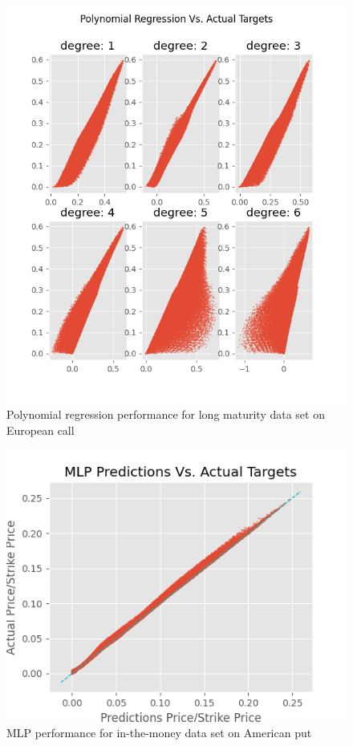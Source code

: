 \begin{figure}[th]
\centering
\includegraphics{Figures/polynomialLongTEuroC.png}
\decoRule
\caption[Polynomial Regression Performance for Long Maturity Data Set European Call]{Polynomial regression performance for long maturity data set on European call}
\label{fig:MLPsEuroCLongMaturity}
\end{figure}


\begin{figure}[th]
\centering
\includegraphics{Figures/inMoneyAmerPut.png}
\decoRule
\caption[MLP Performance for In-the-Money Data Set American Put]{MLP performance for in-the-money data set on American put}
\label{fig:MLPsAmerPOutMoney}
\end{figure}

